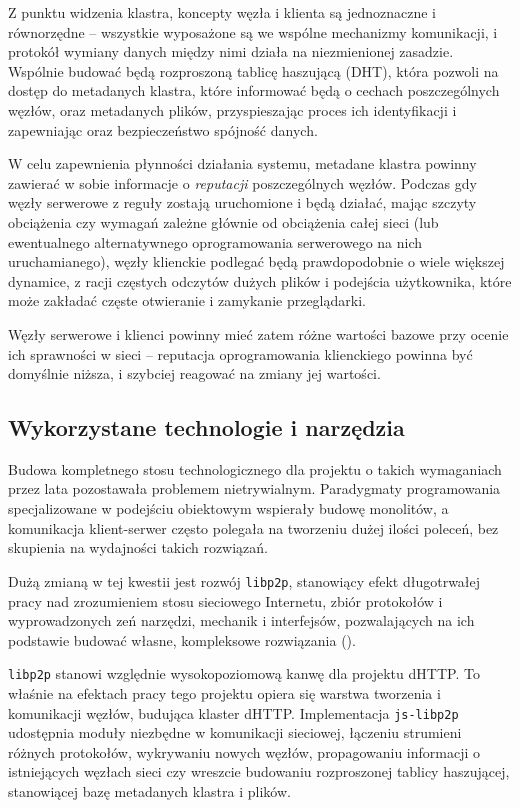 Z punktu widzenia klastra, koncepty węzła i klienta są jednoznaczne i równorzędne -- wszystkie wyposażone są we wspólne mechanizmy komunikacji, i protokół wymiany danych między nimi działa na niezmienionej zasadzie. Wspólnie budować będą rozproszoną tablicę haszującą (DHT), która pozwoli na dostęp do metadanych klastra, które informować będą o cechach poszczególnych węzłów, oraz metadanych plików, przyspieszając proces ich identyfikacji i zapewniając oraz bezpieczeństwo spójność danych.

W celu zapewnienia płynności działania systemu, metadane klastra powinny zawierać w sobie informacje o {\em reputacji} poszczególnych węzłów. Podczas gdy węzły serwerowe z reguły zostają uruchomione i będą działać, mając szczyty obciążenia czy wymagań zależne głównie od obciążenia całej sieci (lub ewentualnego alternatywnego oprogramowania serwerowego na nich uruchamianego), węzły klienckie podlegać będą prawdopodobnie o wiele większej dynamice, z racji częstych odczytów dużych plików i podejścia użytkownika, które może zakładać częste otwieranie i zamykanie przeglądarki.

Węzły serwerowe i klienci powinny mieć zatem różne wartości bazowe przy ocenie ich sprawności w sieci -- reputacja oprogramowania klienckiego powinna być domyślnie niższa, i szybciej reagować na zmiany jej wartości.

\subsection{Wykorzystane technologie i narzędzia}
\label{sec:techNTools}

Budowa kompletnego stosu technologicznego dla projektu o takich wymaganiach przez lata pozostawała problemem nietrywialnym. Paradygmaty programowania specjalizowane w podejściu obiektowym wspierały budowę monolitów, a komunikacja klient-serwer często polegała na tworzeniu dużej ilości poleceń, bez skupienia na wydajności takich rozwiązań.

Dużą zmianą w tej kwestii jest rozwój \texttt{libp2p}, stanowiący efekt długotrwałej pracy nad zrozumieniem stosu sieciowego Internetu, zbiór protokołów i wyprowadzonych zeń narzędzi, mechanik i interfejsów, pozwalających na ich podstawie budować własne, kompleksowe rozwiązania (\cite{libp2p-specs}).

\texttt{libp2p} stanowi względnie wysokopoziomową kanwę dla projektu dHTTP. To właśnie na efektach pracy tego projektu opiera się warstwa tworzenia i komunikacji węzłów, budująca klaster dHTTP. Implementacja \texttt{js-libp2p} udostępnia moduły niezbędne w komunikacji sieciowej, łączeniu strumieni różnych protokołów, wykrywaniu nowych węzłów, propagowaniu informacji o istniejących węzłach sieci czy wreszcie budowaniu rozproszonej tablicy haszującej, stanowiącej bazę metadanych klastra i plików.

